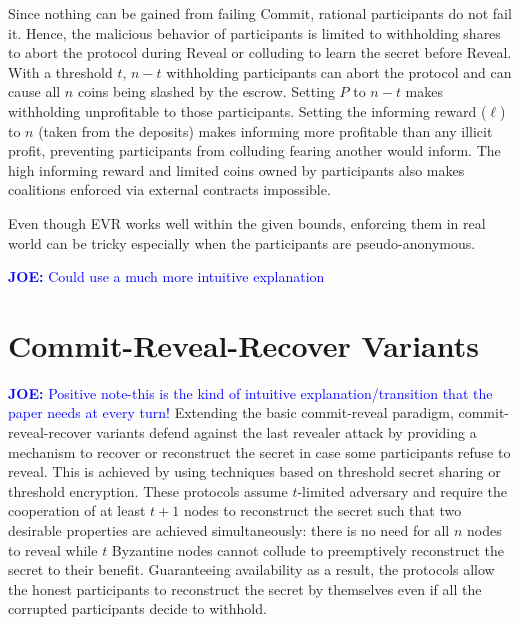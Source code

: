 \documentclass[letterpaper,twocolumn,10pt]{article}
\theoremstyle{definition}
\theoremstyle{remark}
\newcommand{\joenote}[1]{\textcolor{blue}{\textbf{JOE:} #1}}
\begin{document}
Since nothing can be gained from failing Commit, rational participants do not fail it. Hence, the malicious behavior of participants is limited to withholding shares to abort the protocol during Reveal or colluding to learn the secret before Reveal. With a threshold $t$, $n-t$ withholding participants can abort the protocol and can cause all $n$ coins being slashed by the escrow. Setting $P$ to $n-t$ makes withholding unprofitable to those participants. Setting the informing reward ($\ell$) to $n$ (taken from the deposits) makes informing more profitable than any illicit profit, preventing participants from colluding fearing another would inform. The high informing reward and limited coins owned by participants also makes coalitions enforced via external contracts impossible.

Even though EVR works well within the given bounds, enforcing them in real world can be tricky especially when the participants are pseudo-anonymous.

\joenote{Could use a much more intuitive explanation}
\section{Commit-Reveal-Recover Variants}
\label{section:commit-reveal-recover}
\joenote{Positive note-this is the kind of intuitive explanation/transition that the paper needs at every turn!}
Extending the basic commit-reveal paradigm, commit-reveal-recover variants defend against the last revealer attack by providing a mechanism to recover or reconstruct the secret in case some participants refuse to reveal. This is achieved by using techniques based on threshold secret sharing or threshold encryption. These protocols assume $t$-limited adversary and require the cooperation of at least $t + 1$ nodes to reconstruct the secret such that two desirable properties are achieved simultaneously: there is no need for all $n$ nodes to reveal while $t$ Byzantine nodes cannot collude to preemptively reconstruct the secret to their benefit. Guaranteeing availability as a result, the protocols allow the honest participants to reconstruct the secret by themselves even if all the corrupted participants decide to withhold.
\end{document}
